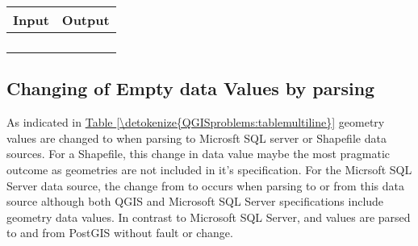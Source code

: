 \documentclass[a4paper,11pt,english]{sphinxmanual}
\begin{document}
\begin{savenotes}\sphinxattablestart
\centering
{}
\sphinxthecaptionisattop
{}\label{\detokenize{QGISproblems:id22}}\label{\detokenize{QGISproblems:tablevii}}
\sphinxaftertopcaption
\begin{tabulary}{\linewidth}[t]{|T|T|}
\hline
\sphinxstyletheadfamily 
Input
&\sphinxstyletheadfamily 
Output
\\
\hline
{}
&
\\
\hline
{}
&
\\
\hline
{}
&
\\
\hline
{}
&
\\
\hline
\end{tabulary}
\par
\sphinxattableend\end{savenotes}


\subsection{Changing of Empty data Values by parsing}
\label{\detokenize{QGISproblems:changing-of-empty-data-values-by-parsing}}
As indicated in \hyperref[\detokenize{QGISproblems:tablemultiline}]{Table \ref{\detokenize{QGISproblems:tablemultiline}}}  geometry values are changed to  when parsing to Microsft SQL server or Shapefile data sources.  For a Shapefile, this change in data value maybe the most pragmatic outcome as  geometries are not included in it’s specification.  For the Micrsoft SQL Server data source, the change from  to  occurs when parsing to or from this data source  although both QGIS and Microsoft SQL Server specifications include  geometry data values.  In contrast to Microsoft SQL Server,  and  values are parsed to and from PostGIS without fault or change.
\end{document}
